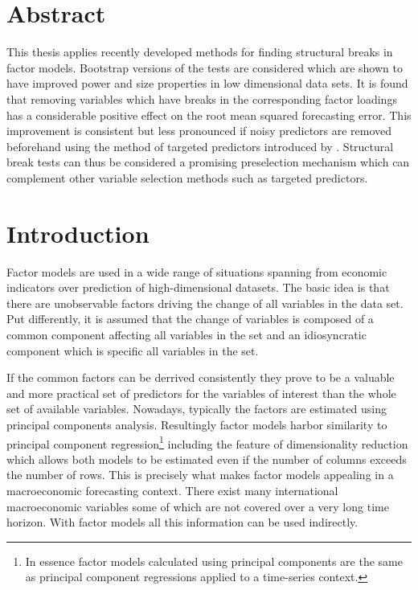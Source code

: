 \documentclass[12pt]{article}
\begin{document}
\section*{Abstract}
This thesis applies recently developed methods for finding structural breaks in factor models. Bootstrap versions of the tests are considered which are shown to have improved power and size properties in low dimensional data sets. It is found that removing variables which have breaks in the corresponding factor loadings has a considerable positive effect on the root mean squared forecasting error. This improvement is consistent but less pronounced if noisy predictors are removed beforehand using the method of targeted predictors introduced by \citet{bai2008forecasting}. Structural break tests can thus be considered a promising preselection mechanism which can complement other variable selection methods such as targeted predictors.

\section*{Introduction}
Factor models are used in a wide range of situations spanning from economic indicators over prediction of high-dimensional datasets. The basic idea is that there are unobservable factors driving the change of all variables in the data set. Put differently, it is assumed that the change of variables is composed of a common component affecting all variables in the set and an idiosyncratic component which is specific all variables in the set.

If the common factors can be derrived consistently they prove to be a valuable and more practical set of predictors for the variables of interest than the whole set of available variables. Nowadays, typically the factors are estimated using principal components analysis. Resultingly factor models harbor similarity to principal component regression\footnote{In essence factor models calculated using principal components are the same as principal component regressions applied to a time-series context.} including the feature of dimensionality reduction which allows both models to be estimated even if the number of columns exceeds the number of rows. This is precisely what makes factor models appealing in a macroeconomic forecasting context. There exist many international macroeconomic variables some of which are not covered over a very long time horizon. With factor models all this information can be used indirectly.
\end{document}
